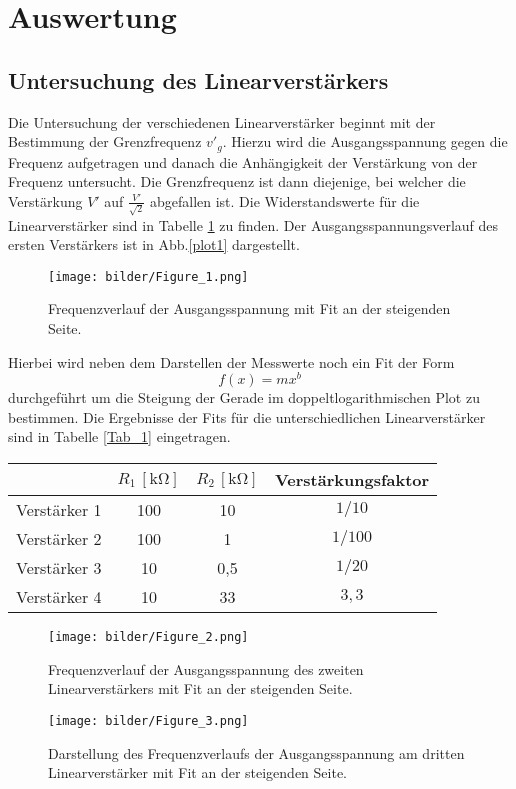 \section{Auswertung}
\subsection{Untersuchung des Linearverstärkers}
Die Untersuchung der verschiedenen Linearverstärker beginnt mit der Bestimmung der Grenzfrequenz $v'_g$. Hierzu wird die Ausgangsspannung gegen die Frequenz aufgetragen und danach die Anhängigkeit der Verstärkung von der Frequenz untersucht. Die Grenzfrequenz ist dann diejenige, bei welcher die Verstärkung $V'$ auf $\frac{V'}{\sqrt{2}}$ abgefallen ist.
Die Widerstandswerte für die Linearverstärker sind in Tabelle \ref{Tab_2} zu finden. Der Ausgangsspannungsverlauf des ersten Verstärkers ist in Abb.\ref{plot1} dargestellt.
\begin{figure}[h]
  \centering
  \texttt{[image: bilder/Figure\_1.png]}
  \caption{Frequenzverlauf der Ausgangsspannung mit Fit an der steigenden Seite.}
  \label{Aufbau}
\end{figure}
Hierbei wird neben dem Darstellen der Messwerte noch ein Fit der Form
\begin{equation}
f(x)=mx^b
\end{equation}
durchgeführt um die Steigung der Gerade im doppeltlogarithmischen Plot zu bestimmen. Die Ergebnisse der Fits für die unterschiedlichen Linearverstärker sind in Tabelle \ref{Tab_1} eingetragen.
\begin{table}[]
\centering
\begin{tabular}{c|ccc}
&$R_1\,[\si{\kilo\ohm}]$&$R_2\,[\si{\kilo\ohm}]$&Verstärkungsfaktor\\
\hline
Verstärker 1 & 100 & 10  &$1/10$\\
Verstärker 2 & 100 & 1   &$1/100$\\
Verstärker 3 & 10  & 0,5 &$1/20$\\
Verstärker 4 & 10  & 33  &$3{,}3$
\end{tabular}
\label{Tab_2}
\end{table}
\begin{figure}[h]
  \centering
  \texttt{[image: bilder/Figure\_2.png]}
  \caption{Frequenzverlauf der Ausgangsspannung des zweiten Linearverstärkers mit Fit an der steigenden Seite.}
  \label{Aufbau}
\end{figure}
\begin{figure}[h]
  \centering
  \texttt{[image: bilder/Figure\_3.png]}
  \caption{Darstellung des Frequenzverlaufs der Ausgangsspannung am dritten Linearverstärker mit Fit an der steigenden Seite.}
  \label{Aufbau}
\end{figure}
